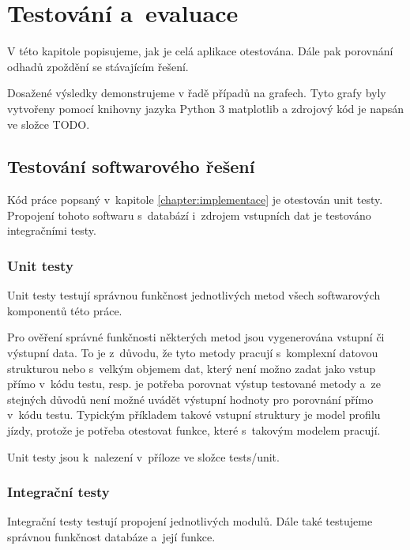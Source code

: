 

\chapter{Testování a~evaluace}


V této kapitole popisujeme, jak je celá aplikace otestována. Dále pak porovnání odhadů zpoždění se stávajícím řešení.

\bigbreak

Dosažené výsledky demonstrujeme v řadě případů na grafech. Tyto grafy byly vytvořeny pomocí knihovny jazyka Python 3 matplotlib a zdrojový kód je napsán ve složce TODO.

\section{Testování softwarového řešení}

Kód práce popsaný v~kapitole \ref{chapter:implementace} je otestován unit testy. Propojení tohoto softwaru s~databází i~zdrojem vstupních dat je testováno integračními testy.


\subsection{Unit testy}

Unit testy testují správnou funkčnost jednotlivých metod všech softwarových komponentů této práce.

\bigbreak

Pro ověření správné funkčnosti některých metod jsou vygenerována vstupní či výstupní data. To je z~důvodu, že tyto metody pracují s~komplexní datovou strukturou nebo s~velkým objemem dat, který není možno zadat jako vstup přímo v~kódu testu, resp. je potřeba porovnat výstup testované metody a~ze stejných důvodů není možné uvádět výstupní hodnoty pro porovnání přímo v~kódu testu. Typickým příkladem takové vstupní struktury je model profilu jízdy, protože je potřeba otestovat funkce, které s~takovým modelem pracují.

\bigbreak

Unit testy jsou k~nalezení v~příloze ve složce tests/unit.


\subsection{Integrační testy}

Integrační testy testují propojení jednotlivých modulů. Dále také testujeme správnou funkčnost databáze a~její funkce.

